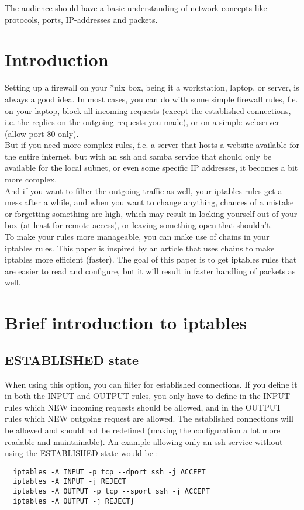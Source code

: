 \documentclass[a4paper,12pt]{article}
\begin{document}
The audience should have a basic understanding of network concepts like protocols, ports, IP-addresses and packets.

\pagebreak
\tableofcontents

\section{Introduction}
Setting up a firewall on your *nix box, being it a workstation, laptop, or server, is always a good idea. In most cases, you can do with some simple firewall rules, f.e. on your laptop, block all incoming requests (except the established connections, i.e. the replies on the outgoing requests you made), or on a simple webserver (allow port 80 only).\\

But if you need more complex rules, f.e. a server that hosts a website available for the entire internet, but with an ssh and samba service that should only be available for the local subnet, or even some specific IP addresses, it becomes a bit more complex.\\
And if you want to filter the outgoing traffic as well, your iptables rules get a mess after a while, and when you want to change anything, chances of a mistake or forgetting something are high, which may result in locking yourself out of your box (at least for remote access), or leaving something open that shouldn't.\\

To make your rules more manageable, you can make use of chains in your iptables rules. This paper is inspired by an article that uses chains to make iptables more efficient (faster). The goal of this paper is to get iptables rules that are easier to read and configure, but it will result in faster handling of packets as well.\\
\section{Brief introduction to iptables}
\subsection{ESTABLISHED state}
When using this option, you can filter for established connections. If you define it in both the INPUT and OUTPUT rules, you only have to define in the INPUT rules which NEW incoming requests should be allowed, and in the OUTPUT rules which NEW outgoing request are allowed. The established connections will be allowed and should not be redefined (making the configuration a lot more readable and maintainable). An example allowing only an ssh service without using the ESTABLISHED state would be :
\begin{verbatim}
  iptables -A INPUT -p tcp --dport ssh -j ACCEPT
  iptables -A INPUT -j REJECT
  iptables -A OUTPUT -p tcp --sport ssh -j ACCEPT
  iptables -A OUTPUT -j REJECT}
\end{verbatim}
\end{document}
